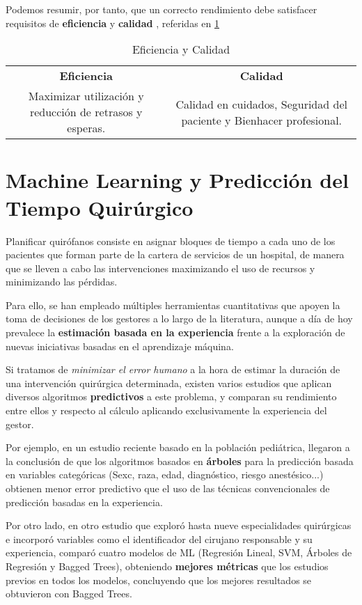 Podemos resumir, por tanto, que un correcto rendimiento debe satisfacer requisitos de \textbf{eficiencia }y \textbf{calidad} \cite{Sandbaek2014ImpactEfficiency} , referidas en \ref{Eficiencia y Calidad}
\begin{table}[]
    \centering
    \begin{tabular}{c|c}
       \textbf{Eficiencia}  &  \textbf{Calidad} \\
        Maximizar utilización y reducción de retrasos y esperas. & Calidad en cuidados, Seguridad del paciente y Bienhacer profesional. 
    \end{tabular}
    \caption{Eficiencia y Calidad}
    \label{Eficiencia y Calidad}
\end{table}
\newpage
\section{Machine Learning y Predicción del Tiempo Quirúrgico}
Planificar quirófanos consiste en asignar bloques de tiempo a cada uno de los pacientes que forman parte de la cartera de servicios de un hospital, de manera que se lleven a cabo las intervenciones maximizando el uso de recursos y minimizando las pérdidas.

Para ello, se han empleado múltiples herramientas cuantitativas que apoyen la toma de decisiones de los gestores a lo largo de la literatura, aunque a día de hoy prevalece la \textbf{estimación basada en la experiencia} \cite{Brailsford2011ORPerspective} frente a la exploración de nuevas iniciativas basadas en el aprendizaje máquina. 

Si tratamos de \textit{minimizar el error humano} a la hora de estimar la duración de una intervención quirúrgica determinada, existen varios estudios que aplican diversos algoritmos \textbf{predictivos} a este problema, y comparan su rendimiento entre ellos y respecto al cálculo aplicando exclusivamente la experiencia del gestor.

Por ejemplo, en un estudio reciente \cite{Master2017ImprovingLearning} basado en la población pediátrica, llegaron a la conclusión de que los algoritmos basados en \textbf{árboles} para la predicción basada en variables categóricas (Sexc, raza, edad, diagnóstico, riesgo anestésico...) obtienen menor error predictivo que el uso de las técnicas convencionales de predicción basadas en la experiencia.

Por otro lado, en otro estudio que exploró hasta nueve especialidades quirúrgicas \cite{Martinez2021MachinePrediction} e incorporó variables como el identificador del cirujano responsable y su experiencia, comparó cuatro modelos de ML (Regresión Lineal, SVM, Árboles de Regresión y Bagged Trees), obteniendo \textbf{mejores métricas} que los estudios previos en todos los modelos, concluyendo que los mejores resultados se obtuvieron con Bagged Trees.

